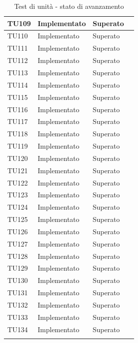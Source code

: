 \begin{longtable}{|>{\centering\arraybackslash}m{1.6cm}|>{\centering\arraybackslash}m{6.41cm}|>{\centering\arraybackslash}m{3.1cm}| c |}
		\rowcolor{LightGray}
	TU109 & Implementato & Superato  \\ \hline
	TU110 & Implementato & Superato  \\ \hline
		\rowcolor{LightGray}
	TU111 & Implementato & Superato  \\ \hline
	TU112 & Implementato & Superato  \\ \hline
		\rowcolor{LightGray}
	TU113 & Implementato & Superato  \\ \hline
	TU114 & Implementato & Superato  \\ \hline
		\rowcolor{LightGray}
	TU115 & Implementato & Superato  \\ \hline
	TU116 & Implementato & Superato  \\ \hline
		\rowcolor{LightGray}
	TU117 & Implementato & Superato  \\ \hline
	TU118 & Implementato & Superato  \\ \hline
		\rowcolor{LightGray}
	TU119 & Implementato & Superato  \\ \hline
	TU120 & Implementato & Superato  \\ \hline
		\rowcolor{LightGray}
	TU121 & Implementato & Superato  \\ \hline
	TU122 & Implementato & Superato  \\ \hline
		\rowcolor{LightGray}
	TU123 & Implementato & Superato  \\ \hline
	TU124 & Implementato & Superato  \\ \hline
		\rowcolor{LightGray}
	TU125 & Implementato & Superato  \\ \hline
	TU126 & Implementato & Superato  \\ \hline
		\rowcolor{LightGray}
	TU127 & Implementato & Superato  \\ \hline
	TU128 & Implementato & Superato  \\ \hline
		\rowcolor{LightGray}
	TU129 & Implementato & Superato  \\ \hline
	TU130 & Implementato & Superato  \\ \hline
		\rowcolor{LightGray}
	TU131 & Implementato & Superato  \\ \hline
	TU132 & Implementato & Superato  \\ \hline
		\rowcolor{LightGray}
	TU133 & Implementato & Superato  \\ \hline
	TU134 & Implementato & Superato  \\ \hline
	
	\caption{Test di unità - stato di avanzamento}
\end{longtable}

